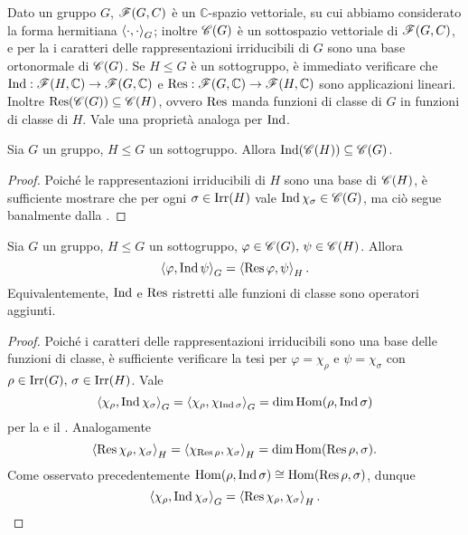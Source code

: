 Dato un gruppo $G$, $\mathscr{F}(G,C)$ è un $\mathbb{C}$-spazio vettoriale, su cui abbiamo considerato la forma hermitiana $\left\langle\cdot,\cdot\right\rangle_G$; inoltre $\mathscr{C}(G)$ è un sottospazio vettoriale di $\mathscr{F}(G,C)$, e per la  i caratteri delle rappresentazioni irriducibili di $G$ sono una base ortonormale di $\mathscr{C}(G)$. Se $H\le G$ è un sottogruppo, è immediato verificare che $\operatorname{Ind}:\mathscr{F}(H,\mathbb{C})\to\mathscr{F}(G,\mathbb{C})$ e $\operatorname{Res}:\mathscr{F}(G,\mathbb{C})\to\mathscr{F}(H,\mathbb{C})$ sono applicazioni lineari. Inoltre $\operatorname{Res}(\mathscr{C}(G))\subseteq\mathscr{C}(H)$, ovvero $\operatorname{Res}$ manda funzioni di classe di $G$ in funzioni di classe di $H$. Vale una proprietà analoga per $\operatorname{Ind}$.

\begin{proposition}
Sia $G$ un gruppo, $H\le G$ un sottogruppo. Allora $\operatorname{Ind}(\mathscr{C}(H))\subseteq\mathscr{C}(G)$.
\end{proposition}
\begin{proof}
Poiché le rappresentazioni irriducibili di $H$ sono una base di $\mathscr{C}(H)$, è sufficiente mostrare che per ogni $\sigma\in\operatorname{Irr}(H)$ vale $\operatorname{Ind}\chi_\sigma\in\mathscr{C}(G)$, ma ciò segue banalmente dalla .
\end{proof}

\begin{proposition}
Sia $G$ un gruppo, $H\le G$ un sottogruppo, $\varphi\in\mathscr{C}(G),\,\allowbreak\psi\in\mathscr{C}(H)$. Allora
$$
\left\langle\varphi,\operatorname{Ind}\psi\right\rangle_G=\left\langle\operatorname{Res}\varphi,\psi\right\rangle_H.
$$
Equivalentemente, $\operatorname{Ind}$ e $\operatorname{Res}$ ristretti alle funzioni di classe sono operatori aggiunti.
\end{proposition}
\begin{proof}
Poiché i caratteri delle rappresentazioni irriducibili sono una base delle funzioni di classe, è sufficiente verificare la tesi per $\varphi=\chi_\rho$ e $\psi=\chi_\sigma$ con $\rho\in\operatorname{Irr}(G),\,\allowbreak\sigma\in\operatorname{Irr}(H)$. Vale
$$
\left\langle\chi_\rho,\operatorname{Ind}\chi_\sigma\right\rangle_G=\left\langle\chi_\rho,\chi_{\operatorname{Ind}\sigma}\right\rangle_G=\dim\operatorname{Hom}(\rho,\operatorname{Ind}\sigma)
$$
per la  e il . Analogamente
$$
\left\langle\operatorname{Res}\chi_\rho,\chi_\sigma\right\rangle_H=\left\langle\chi_{\operatorname{Res}\rho},\chi_\sigma\right\rangle_H=\dim\operatorname{Hom}(\operatorname{Res}\rho,\sigma).
$$
Come osservato precedentemente $\operatorname{Hom}(\rho,\operatorname{Ind}\sigma)\cong\operatorname{Hom}(\operatorname{Res}\rho,\sigma)$, dunque
$$
\left\langle\chi_\rho,\operatorname{Ind}\chi_\sigma\right\rangle_G=\left\langle\operatorname{Res}\chi_\rho,\chi_\sigma\right\rangle_H.
$$
\end{proof}